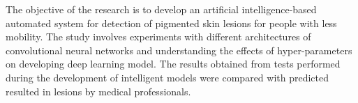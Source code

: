 The objective of the research is to develop an artificial intelligence-based automated system for detection of pigmented skin lesions for people with less mobility. The study involves experiments with different architectures of convolutional neural networks and understanding the effects of hyper-parameters on developing deep learning model. The results obtained from tests performed during the development of intelligent models were compared with predicted resulted in lesions by medical professionals.
